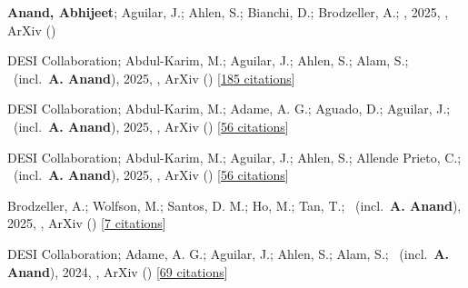 \item[{\color{numcolor}\scriptsize9}] \textbf{Anand, Abhijeet}; Aguilar, J.; Ahlen, S.; Bianchi, D.; Brodzeller, A.; \etal, 2025, , ArXiv ()

\item[{\color{numcolor}\scriptsize8}] DESI Collaboration; Abdul-Karim, M.; Aguilar, J.; Ahlen, S.; Alam, S.; \etal\ (incl.\ \textbf{A. Anand}), 2025, , ArXiv () [\href{https://ui.adsabs.harvard.edu/abs/2025arXiv250314738D}{185 citations}]

\item[{\color{numcolor}\scriptsize7}] DESI Collaboration; Abdul-Karim, M.; Adame, A. G.; Aguado, D.; Aguilar, J.; \etal\ (incl.\ \textbf{A. Anand}), 2025, , ArXiv () [\href{https://ui.adsabs.harvard.edu/abs/2025arXiv250314745D}{56 citations}]

\item[{\color{numcolor}\scriptsize6}] DESI Collaboration; Abdul-Karim, M.; Aguilar, J.; Ahlen, S.; Allende Prieto, C.; \etal\ (incl.\ \textbf{A. Anand}), 2025, , ArXiv () [\href{https://ui.adsabs.harvard.edu/abs/2025arXiv250314739D}{56 citations}]

\item[{\color{numcolor}\scriptsize5}] Brodzeller, A.; Wolfson, M.; Santos, D. M.; Ho, M.; Tan, T.; \etal\ (incl.\ \textbf{A. Anand}), 2025, , ArXiv () [\href{https://ui.adsabs.harvard.edu/abs/2025arXiv250314740B}{7 citations}]

\item[{\color{numcolor}\scriptsize4}] DESI Collaboration; Adame, A. G.; Aguilar, J.; Ahlen, S.; Alam, S.; \etal\ (incl.\ \textbf{A. Anand}), 2024, , ArXiv () [\href{https://ui.adsabs.harvard.edu/abs/2024arXiv241112021D}{69 citations}]

